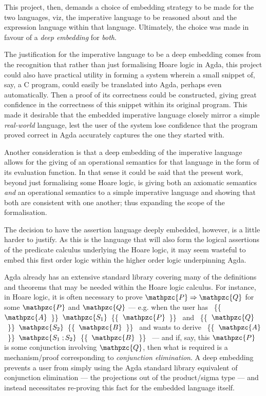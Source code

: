 \documentclass[oneside,12pt]{article}
\newcommand{\textM}[1]{\ensuremath{\mathpzc{#1}}}
\newcommand{\gtcil}[3]{ \!\!\!\!   \{\!\!\{  \!\!\!  \textM{#1} \!\!\! \}\!\!\} \textM{#2}   \{\!\!\{  \!\!\! \textM{#3} \!\!\!  \}\!\!\} \!\!\!  }
\begin{document}
This project, then, demands a choice of embedding strategy to be made for the two languages, viz, the imperative language to be reasoned about and the expression language within that language. Ultimately, the choice was made in favour of a \emph{deep embedding} for \emph{both}.

The justification for the imperative language to be a deep \mbox{embedding} comes from the recognition that rather than just formalising Hoare logic in Agda, this project could also have practical utility in forming a system wherein a small snippet of, say, a C program, could easily be translated into Agda, perhaps even automatically. Then a proof of its correctness could be constructed, giving great confidence in the correctness of this snippet within its original program. This made it desirable that the embedded imperative language closely mirror a simple \emph{real-world} language, lest the user of the system lose confidence that the program proved correct in Agda accurately captures the one they started with.

Another consideration is that a deep embedding of the imperative language allows for the giving of an operational semantics for that language in the form of its evaluation function. In that sense it could be said that the present work, beyond just formalising some Hoare logic, is giving both an axiomatic semantics \emph{and} an operational semantics to a simple imperative language and showing that both are consistent with one another; thus expanding the scope of the formalisation.


The decision to have the assertion language deeply embedded, however, is a little harder to justify. As this is the language that will also form the logical assertions of the predicate calculus underlying the Hoare logic, it may seem wasteful to embed this first order logic within the higher order logic underpinning Agda.

Agda already has an extensive standard library covering many of the definitions and theorems that may be needed within the Hoare logic calculus. For instance, in Hoare logic, it is often necessary to prove $\textM{P} \Rightarrow \textM{Q}$ for some \textM{P} and \textM{Q} --- e.g.\! when the user has \mbox{\gtcil{A}{S_1}{P}} and \mbox{\gtcil{Q}{S_2}{B}} and wants to derive \mbox{\gtcil{A}{S_1 \; ; S_2}{B}} --- and if, say, this \textM{P} is some conjunction involving \textM{Q}, then what is required is a mechanism/proof corresponding to \emph{conjunction elimination}. A deep embedding prevents a user from simply using the Agda standard library equivalent of conjunction elimination --- the projections out of the product/sigma type --- and instead necessitates re-proving this fact for the embedded language itself.
\end{document}

